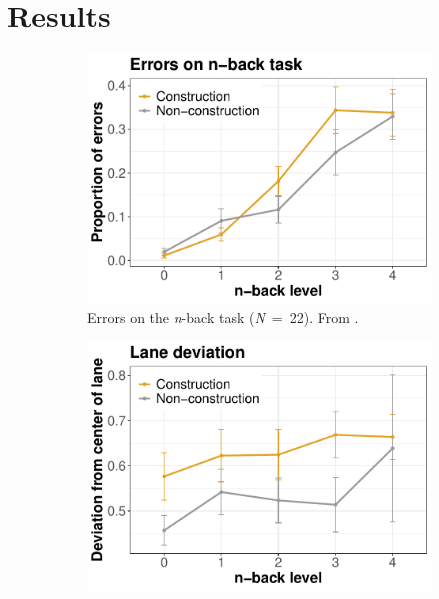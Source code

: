 
\section{Results}\label{sec:results}
\renewcommand{\thefigure}{\thesection.\arabic{figure}}
\begin{figure}
  \centering
  \begin{subfigure}[b]{0.3\textwidth}
    \centering
    \includegraphics[width=\textwidth]{images/error_rates.pdf}
    \caption{Errors on the \textit{n}-back task (\textit{N}\ =\ 22). From \citet{DeMooij2021}.}
    \label{fig:errors}
  \end{subfigure}
  \hfill
  \begin{subfigure}[b]{0.3\textwidth}
    \centering
    \includegraphics[width=\textwidth]{images/lane_deviation.pdf}

\end{subfigure}
\end{figure}
